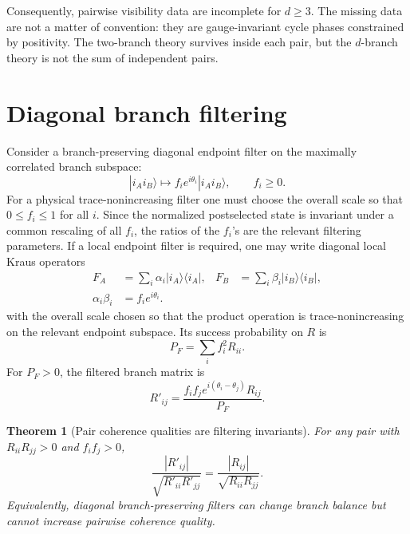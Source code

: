 \documentclass[reprint,aps,pra,superscriptaddress,nofootinbib,longbibliography]{revtex4-2}
\newtheorem{theorem}{Theorem}
\newcommand{\ket}[1]{|#1\rangle}
\newcommand{\bra}[1]{\langle #1|}
\begin{document}
Consequently, pairwise visibility data are incomplete for \(d\ge3\).  The missing data are not a matter of convention: they are gauge-invariant cycle phases constrained by positivity.  The two-branch theory survives inside each pair, but the \(d\)-branch theory is not the sum of independent pairs.

\section{Diagonal branch filtering}
\label{sec:filtering}

Consider a branch-preserving diagonal endpoint filter on the maximally correlated branch subspace:
\begin{equation}
\ket{i_Ai_B}\mapsto f_i e^{i\theta_i}\ket{i_Ai_B},
\qquad
f_i\ge0.
\label{eq:diag-filter}
\end{equation}
For a physical trace-nonincreasing filter one must choose the overall scale so that \(0\le f_i\le1\) for all \(i\).  Since the normalized postselected state is invariant under a common rescaling of all \(f_i\), the ratios of the \(f_i\)'s are the relevant filtering parameters.  If a local endpoint filter is required, one may write diagonal local Kraus operators
\begin{align}
F_A&=\sum_i \alpha_i\ket{i_A}\bra{i_A},&
F_B&=\sum_i \beta_i\ket{i_B}\bra{i_B},\nonumber\\
\alpha_i\beta_i&=f_i e^{i\theta_i}.&
\end{align}
with the overall scale chosen so that the product operation is trace-nonincreasing on the relevant endpoint subspace.
Its success probability on \(R\) is
\begin{equation}
P_F=\sum_i f_i^2R_{ii}.
\label{eq:filter-P}
\end{equation}
For \(P_F>0\), the filtered branch matrix is
\begin{equation}
R'_{ij}
=
\frac{f_if_j e^{i(\theta_i-\theta_j)}R_{ij}}{P_F}.
\label{eq:R-filtered}
\end{equation}

\begin{theorem}[Pair coherence qualities are filtering invariants]
For any pair with \(R_{ii}R_{jj}>0\) and \(f_if_j>0\),
\begin{equation}
\frac{|R'_{ij}|}{\sqrt{R'_{ii}R'_{jj}}}
=
\frac{|R_{ij}|}{\sqrt{R_{ii}R_{jj}}}.
\label{eq:filter-q-invariant}
\end{equation}
Equivalently, diagonal branch-preserving filters can change branch balance but cannot increase pairwise coherence quality.
\end{theorem}
\end{document}
